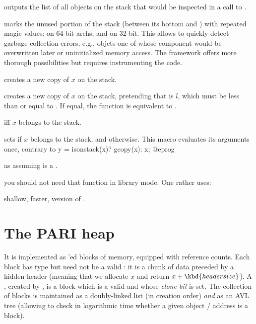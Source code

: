  outputs the list of all objects on the
stack that would be inspected in a call to .

 marks the unused portion of the stack
(between its bottom and ) with repeated magic values:
 on 64-bit archs, and  on 32-bit.
This allows to quickly detect garbage collection errors, e.g., objets one of
whose component would be overwritten later or uninitialized memory access.
The  framework offers more thorough possibilities but requires
instrumenting the code.


 creates a new copy of $x$ on the stack.

 creates a new copy of $x$
on the stack, pretending that  is $l$, which must be less than or
equal to . If equal, the function is equivalent to .

  iff $x$ belongs to the stack.

 sets  if
$x$ belongs to the stack, and  otherwise. This macro evaluates
its arguments once, contrary to
\bprog
  y = isonstack(x)? gcopy(x): x;
@eprog

 as  assuming 
is a .


 you should not need that function in library mode.
One rather uses:

 shallow, faster, version of .

\section{The PARI heap}

It is implemented as 'ed blocks of memory, equipped with
reference counts. Each block has type  but need not be a valid
: it is a chunk of data preceded by a hidden header (meaning that we
allocate $x$ and return $x + \kbd{header size}$). A , created by
, is a block which is a valid  and whose \emph{clone
bit} is set. The collection of blocks is maintained as a doubly-linked list
(in creation order) \emph{and} as an AVL tree (allowing to check in
logarithmic time whether a given object / address is a block).

